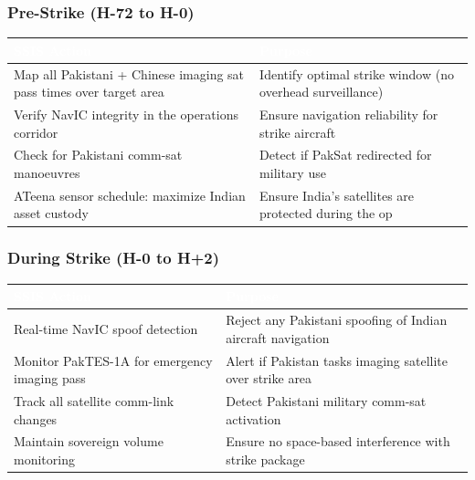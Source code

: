 \documentclass[11pt,a4paper]{article}
\newcommand{\TH}[1]{\textcolor{white}{\textbf{#1}}}
\begin{document}
\subsubsection{Pre-Strike (H-72 to H-0)}
\begin{table}[H]\centering\small
\begin{tabularx}{\textwidth}{|p{6cm}|X|}
\hline
\rowcolor{dblue}\TH{SSIS Action} & \TH{Purpose} \\
\hline
Map all Pakistani + Chinese imaging sat pass times over target area & Identify optimal strike window (no overhead surveillance) \\
\hline
Verify NavIC integrity in the operations corridor & Ensure navigation reliability for strike aircraft \\
\hline
Check for Pakistani comm-sat manoeuvres & Detect if PakSat redirected for military use \\
\hline
ATeena sensor schedule: maximize Indian asset custody & Ensure India's satellites are protected during the op \\
\hline
\end{tabularx}
\end{table}

\subsubsection{During Strike (H-0 to H+2)}
\begin{table}[H]\centering\small
\begin{tabularx}{\textwidth}{|p{6cm}|X|}
\hline
\rowcolor{dblue}\TH{SSIS Action} & \TH{Purpose} \\
\hline
Real-time NavIC spoof detection & Reject any Pakistani spoofing of Indian aircraft navigation \\
\hline
Monitor PakTES-1A for emergency imaging pass & Alert if Pakistan tasks imaging satellite over strike area \\
\hline
Track all satellite comm-link changes & Detect Pakistani military comm-sat activation \\
\hline
Maintain sovereign volume monitoring & Ensure no space-based interference with strike package \\
\hline
\end{tabularx}
\end{table}
\end{document}
